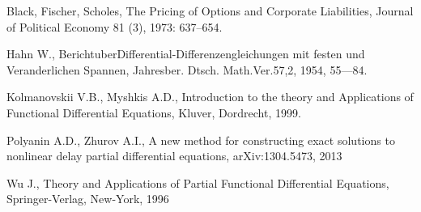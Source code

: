 \begin{thebibliography}{99}
Black, Fischer, Scholes, The Pricing of Options and Corporate Liabilities, Journal of Political Economy 81 (3), 1973: 637–654.

Hahn W., BerichtuberDifferential-Differenzengleichungen mit festen und Veranderlichen Spannen, Jahresber. Dtsch. Math.Ver.57,2, 1954, 55—84.

Kolmanovskii V.B., Myshkis A.D., Introduction to the theory and Applications of Functional Differential Equations, Kluver, Dordrecht, 1999.

Polyanin A.D., Zhurov A.I., A new method for constructing exact solutions to nonlinear delay partial differential equations, arXiv:1304.5473, 2013

Wu J., Theory and Applications of Partial Functional Differential Equations, Springer-Verlag, New-York, 1996

\end{thebibliography}